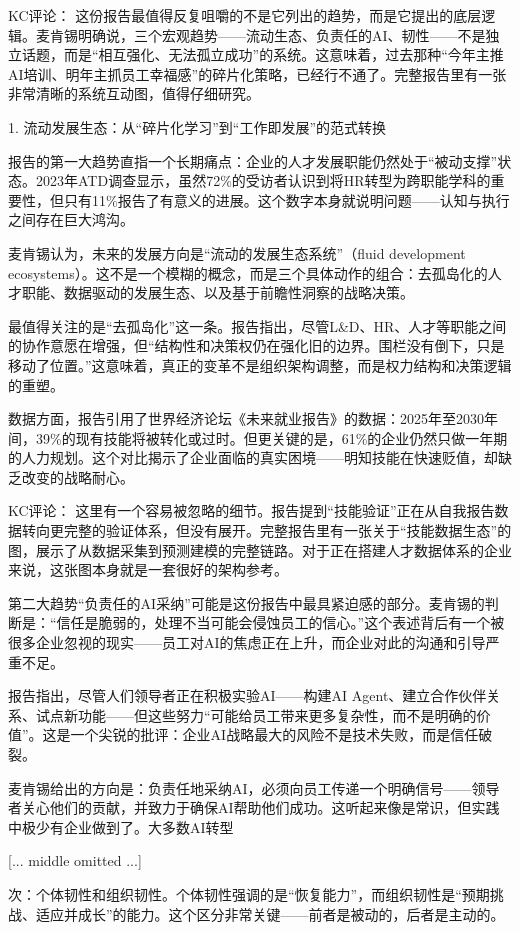 \documentclass[11pt]{ctexart}
\begin{document}
KC评论： 这份报告最值得反复咀嚼的不是它列出的趋势，而是它提出的底层逻辑。麦肯锡明确说，三个宏观趋势——流动生态、负责任的AI、韧性——不是独立话题，而是“相互强化、无法孤立成功”的系统。这意味着，过去那种“今年主推AI培训、明年主抓员工幸福感”的碎片化策略，已经行不通了。完整报告里有一张非常清晰的系统互动图，值得仔细研究。

1. 流动发展生态：从“碎片化学习”到“工作即发展”的范式转换

报告的第一大趋势直指一个长期痛点：企业的人才发展职能仍然处于“被动支撑”状态。2023年ATD调查显示，虽然72\%的受访者认识到将HR转型为跨职能学科的重要性，但只有11\%报告了有意义的进展。这个数字本身就说明问题——认知与执行之间存在巨大鸿沟。

麦肯锡认为，未来的发展方向是“流动的发展生态系统”（fluid development ecosystems）。这不是一个模糊的概念，而是三个具体动作的组合：去孤岛化的人才职能、数据驱动的发展生态、以及基于前瞻性洞察的战略决策。

最值得关注的是“去孤岛化”这一条。报告指出，尽管L\&D、HR、人才等职能之间的协作意愿在增强，但“结构性和决策权仍在强化旧的边界。围栏没有倒下，只是移动了位置。”这意味着，真正的变革不是组织架构调整，而是权力结构和决策逻辑的重塑。

数据方面，报告引用了世界经济论坛《未来就业报告》的数据：2025年至2030年间，39\%的现有技能将被转化或过时。但更关键的是，61\%的企业仍然只做一年期的人力规划。这个对比揭示了企业面临的真实困境——明知技能在快速贬值，却缺乏改变的战略耐心。

KC评论： 这里有一个容易被忽略的细节。报告提到“技能验证”正在从自我报告数据转向更完整的验证体系，但没有展开。完整报告里有一张关于“技能数据生态”的图，展示了从数据采集到预测建模的完整链路。对于正在搭建人才数据体系的企业来说，这张图本身就是一套很好的架构参考。

第二大趋势“负责任的AI采纳”可能是这份报告中最具紧迫感的部分。麦肯锡的判断是：“信任是脆弱的，处理不当可能会侵蚀员工的信心。”这个表述背后有一个被很多企业忽视的现实——员工对AI的焦虑正在上升，而企业对此的沟通和引导严重不足。

报告指出，尽管人们领导者正在积极实验AI——构建AI Agent、建立合作伙伴关系、试点新功能——但这些努力“可能给员工带来更多复杂性，而不是明确的价值”。这是一个尖锐的批评：企业AI战略最大的风险不是技术失败，而是信任破裂。

麦肯锡给出的方向是：负责任地采纳AI，必须向员工传递一个明确信号——领导者关心他们的贡献，并致力于确保AI帮助他们成功。这听起来像是常识，但实践中极少有企业做到了。大多数AI转型

[... middle omitted ...]

次：个体韧性和组织韧性。个体韧性强调的是“恢复能力”，而组织韧性是“预期挑战、适应并成长”的能力。这个区分非常关键——前者是被动的，后者是主动的。
\end{document}
